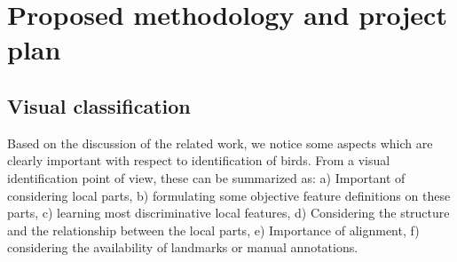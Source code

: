 \documentclass{article}
\begin{document}
\section{Proposed methodology and project plan}

\subsection{Visual classification}

Based on the discussion of the related work, we notice some aspects which are clearly important with respect to identification of birds. From a visual identification point of view, these can be summarized as: a) Important of considering local parts, b) formulating some objective feature definitions on these parts, c) learning most discriminative local features, d) Considering the structure and the relationship between the local parts, e) Importance of alignment, f) considering the availability of landmarks or manual annotations. 
\end{document}
